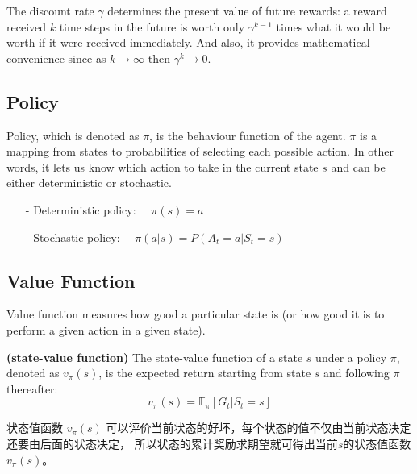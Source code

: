 The discount rate $\gamma$ determines the present value of future rewards: a 
reward received $k$ time steps in the future is worth only $\gamma^{k-1}$ times 
what it would be worth if it were received immediately. And also, it provides 
mathematical convenience since as $k\rightarrow\infty$ then $\gamma^k\rightarrow 0$.


\subsection{Policy}

Policy, which is denoted as $\pi$, is the behaviour function of the agent. $\pi$ 
is a mapping from states to probabilities of selecting each possible action. In 
other words, it lets us know which action to take in the current state $s$ and can 
be either deterministic or stochastic.

\begin{itemize}
\setlength{\parskip}{0pt}
\item[-]
Deterministic policy:
$\quad\pi(s)=a$

\item[-]
Stochastic policy: 
$\quad\pi(a|s)=P(A_t=a|S_t=s)$

\end{itemize}


\subsection{Value Function}

Value function measures how good a particular state is (or how good it is to 
perform a given action in a given state).

\begin{definition} {\rm\bf (state-value function)}
The state-value function of a state $s$ under a policy $\pi$, denoted as $v_\pi(s)$, 
is the expected return starting from state $s$ and following $\pi$ thereafter:
\begin{equation}
v_\pi(s)=\mathbb{E}_\pi[G_t|S_t=s]
\end{equation}
\end{definition}

状态值函数 $v_\pi(s)$ 可以评价当前状态的好坏，每个状态的值不仅由当前状态决定还要由后面的状态决定，
所以状态的累计奖励求期望就可得出当前$s$的状态值函数 $v_\pi(s)$。

